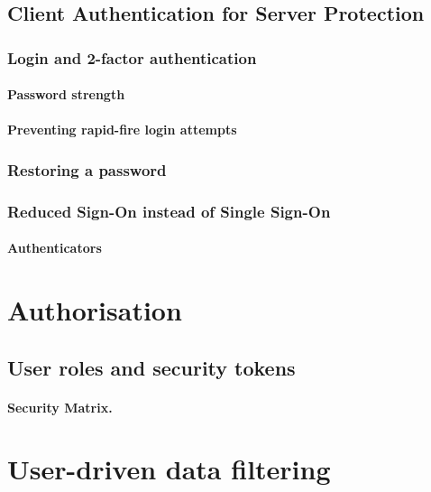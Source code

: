 \documentclass[a4paper,12pt,oneside,openright]{memoir}
\begin{document}
\subsection*{Client Authentication for Server Protection}

\subsubsection*{Login and 2-factor authentication}

\paragraph*{Password strength}

\paragraph*{Preventing rapid-fire login attempts}

\subsubsection*{Restoring a password}


\subsubsection*{Reduced Sign-On instead of Single Sign-On}

\paragraph*{Authenticators}


\section*{Authorisation}

\subsection*{User roles and security tokens}

\paragraph{Security Matrix.}

\section*{User-driven data filtering}
\end{document}
